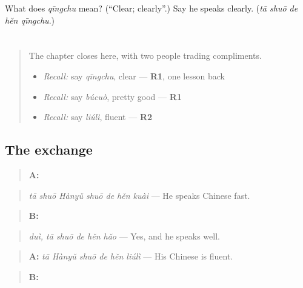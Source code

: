 \begin{tcolorbox}[breakable,colback=teal!4,colframe=teal!35!black,title={Before you move on}]
What does \emph{qīngchu} mean? (\textquotedblleft{}Clear; clearly\textquotedblright{}.) Say he speaks clearly. (\emph{tā shuō de hěn qīngchu}.)
\end{tcolorbox}
\section[Practice]{}

\label{lesson:ZH-C152-practice}



\begin{quote}
The chapter closes here, with two people trading compliments.

\begin{itemize}
\raggedright
  \item \emph{Recall:} say \emph{qīngchu}, clear — \textbf{R1}, one lesson back
  \item \emph{Recall:} say \emph{búcuò}, pretty good — \textbf{R1}
  \item \emph{Recall:} say \emph{liúlì}, fluent — \textbf{R2}
\end{itemize}
\end{quote}

\subsection*{The exchange}
\begin{quote}
\textbf{A:} 
\end{quote}

\begin{quote}
\emph{tā shuō Hànyǔ shuō de hěn kuài} — He speaks Chinese fast.
\end{quote}

\begin{quote}
\textbf{B:}  
\end{quote}

\begin{quote}
\emph{duì, tā shuō de hěn hǎo} — Yes, and he speaks well.
\end{quote}

\begin{quote}
\textbf{A:} \emph{tā Hànyǔ shuō de hěn liúlì} — His Chinese is fluent.
\end{quote}

\begin{quote}
\textbf{B:} 
\end{quote}

